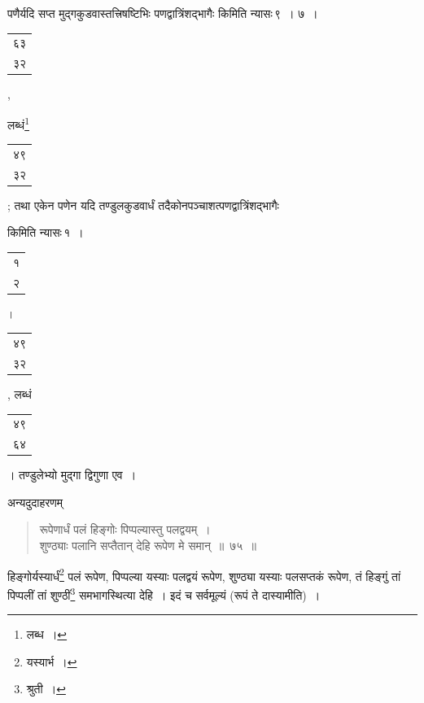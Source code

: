 \documentclass[10pt, openany]{book}
\begin{document}
{{{पणैर्यदि सप्त मुद्गकुडवास्तत्त्रिषष्टिभिः पणद्वात्रिंशद्भागैः किमिति
न्यासः\textendash \,९~। ७~।\begin{tabular}{r}६३\\ ३२\end{tabular},}
{लब्धं\renewcommand{\thefootnote}{\s १४}\footnote{\s लब्ध~।}\begin{tabular}{r}४९\\ ३२\end{tabular}; तथा एकेन पणेन यदि तण्डुलकुडवार्धं
तदैकोनपञ्चाशत्पणद्वात्रिंशद्भागैः} 
{किमिति न्यासः\textendash \,१~।\begin{tabular}{r}१\\२\end{tabular}।\begin{tabular}{r}४९\\  ३२\end{tabular}, लब्धं\begin{tabular}{r}४९\\ ६४\end{tabular}।
तण्डुलेभ्यो मुद्गा द्विगुणा एव~।}


\newpage


{अन्यदुदाहरणम्\textemdash}

\begin{quote}
    
{\eg  रूपेणार्धं पलं हिङ्गोः पिप्पल्यास्तु पलद्वयम्~। \\
 शुण्ठ्याः पलानि सप्तैतान् देहि रूपेण मे समान्~॥~७५~॥}\end{quote} 

{हिङ्गोर्यस्यार्धं\renewcommand{\thefootnote}{\s १}\footnote{\s यस्यार्भ~।}  पलं रूपेण, पिप्पल्या यस्याः पलद्वयं रूपेण,
शुण्ठ्या यस्याः पलसप्तकं}
{रूपेण, तं हिङ्गुं तां पिप्पलीं तां शुण्ठीं\renewcommand{\thefootnote}{\s २}\footnote{\s श्रुती~।}  समभागस्थित्या देहि~। इदं
च सर्वमूल्यं (रूपं ते दास्यामीति)~।}
\vspace{1mm}

}}
\end{document}
